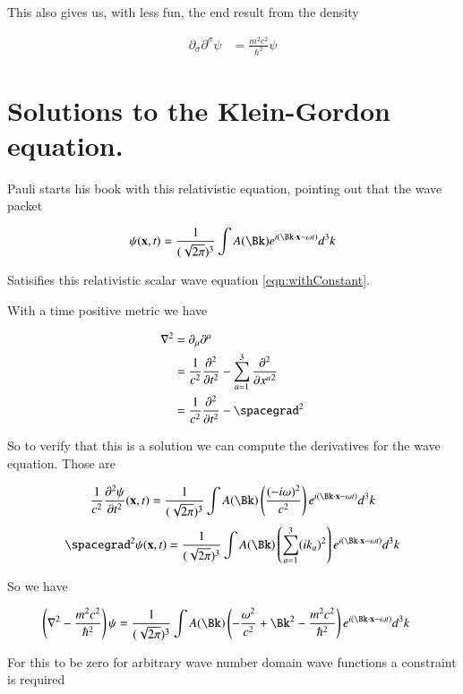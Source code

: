 \documentclass{article}
\newcommand{\PDSq}[2]{\frac{\partial^2 {#2}}{\partial {#1}^2}}
\begin{document}
This also gives us, with less fun, the end result from the density

\begin{align*}
\partial_\sigma \partial^\sigma \psi &= \frac{m^2 c^2}{\hbar^2}\psi
\end{align*}

\section{ Solutions to the Klein-Gordon equation. }

Pauli starts his book \cite{pauli2000wm} with this relativistic equation, pointing out that the wave packet

\begin{align}
\psi(\Bx,t) = \inv{(\sqrt{2\pi})^3}\int A(\Bk) e^{ i (\Bk \cdot \Bx - \omega t)} d^3 k
\end{align}

Satisifies this relativistic scalar wave equation \ref{eqn:withConstant}.

With a time positive metric
we have

\begin{align*}
\grad^2
&= \partial_\mu\partial^\mu \\
&= \inv{c^2} \PDSq{t}{} - \sum_{a=1}^3 \PDSq{x^a}{} \\
&= \inv{c^2} \PDSq{t}{} - \spacegrad^2
\end{align*}

So to verify that this is a solution we can compute the derivatives for the wave equation.  Those are

\begin{align*}
\inv{c^2} \PDSq{t} \psi(\Bx,t) = \inv{(\sqrt{2\pi})^3}\int A(\Bk) \left( \frac{(-i\omega)^2}{c^2} \right) e^{ i (\Bk \cdot \Bx - \omega t)} d^3 k
\end{align*}
\begin{align*}
\spacegrad^2 \psi(\Bx,t) = \inv{(\sqrt{2\pi})^3}\int A(\Bk) \left(\sum_{a=1}^3 (i k_a)^2 \right)e^{ i (\Bk \cdot \Bx - \omega t)} d^3 k
\end{align*}

So we have

\begin{align*}
\left( \grad^2 - \frac{m^2 c^2}{\hbar^2} \right) \psi
&=
\inv{(\sqrt{2\pi})^3}\int A(\Bk) \left( -\frac{\omega^2}{c^2} + \Bk^2 - \frac{m^2 c^2}{\hbar^2}
\right)e^{ i (\Bk \cdot \Bx - \omega t)} d^3 k
\end{align*}

For this to be zero for arbitrary wave number domain wave functions a constraint is required
\end{document}
